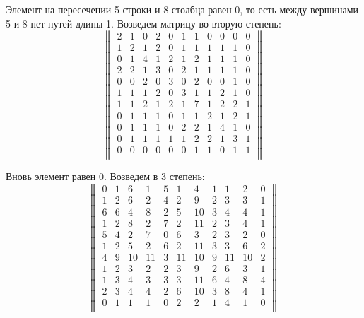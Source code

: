 \documentclass[12pt, a4paper]{extarticle}
\begin{document}
\begin{enumerate}
        Элемент на пересечении 5 строки и 8 столбца равен 0, то есть между вершинами 5 и 8 нет путей длины 1.
        Возведем матрицу во вторую степень:
        \begin{equation}
            \begin{Vmatrix}
                2 & 1 & 0 & 2 & 0 & 1 & 1 & 0 & 0 & 0 & 0 \\
                1 & 2 & 1 & 2 & 0 & 1 & 1 & 1 & 1 & 1 & 0 \\
                0 & 1 & 4 & 1 & 2 & 1 & 2 & 1 & 1 & 1 & 0 \\
                2 & 2 & 1 & 3 & 0 & 2 & 1 & 1 & 1 & 1 & 0 \\
                0 & 0 & 2 & 0 & 3 & 0 & 2 & 0 & 0 & 1 & 0 \\
                1 & 1 & 1 & 2 & 0 & 3 & 1 & 1 & 2 & 1 & 0 \\
                1 & 1 & 2 & 1 & 2 & 1 & 7 & 1 & 2 & 2 & 1 \\
                0 & 1 & 1 & 1 & 0 & 1 & 1 & 2 & 1 & 2 & 1 \\
                0 & 1 & 1 & 1 & 0 & 2 & 2 & 1 & 4 & 1 & 0 \\
                0 & 1 & 1 & 1 & 1 & 1 & 2 & 2 & 1 & 3 & 1 \\
                0 & 0 & 0 & 0 & 0 & 0 & 1 & 1 & 0 & 1 & 1 \\
            \end{Vmatrix}
        \end{equation}
        
        Вновь элемент равен 0. Возведем в 3 степень:
        \begin{equation}
            \begin{Vmatrix}
                0 & 1 & 6 & 1 & 5 & 1 & 4 & 1 & 1 & 2 & 0 \\
                1 & 2 & 6 & 2 & 4 & 2 & 9 & 2 & 3 & 3 & 1 \\
                6 & 6 & 4 & 8 & 2 & 5 & 10 & 3 & 4 & 4 & 1 \\
                1 & 2 & 8 & 2 & 7 & 2 & 11 & 2 & 3 & 4 & 1 \\
                5 & 4 & 2 & 7 & 0 & 6 & 3 & 2 & 3 & 2 & 0 \\
                1 & 2 & 5 & 2 & 6 & 2 & 11 & 3 & 3 & 6 & 2 \\
                4 & 9 & 10 & 11 & 3 & 11 & 10 & 9 & 11 & 10 & 2 \\
                1 & 2 & 3 & 2 & 2 & 3 & 9 & 2 & 6 & 3 & 1 \\
                1 & 3 & 4 & 3 & 3 & 3 & 11 & 6 & 4 & 8 & 4 \\
                2 & 3 & 4 & 4 & 2 & 6 & 10 & 3 & 8 & 4 & 1 \\
                0 & 1 & 1 & 1 & 0 & 2 & 2 & 1 & 4 & 1 & 0 \\
            \end{Vmatrix}
        \end{equation}
        

\end{enumerate}
\end{document}
